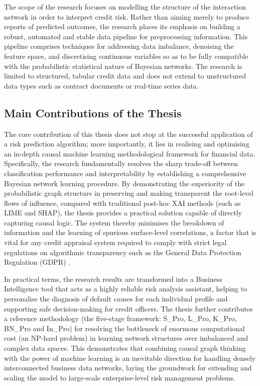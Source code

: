The scope of the research focuses on modelling the structure of the interaction network in order to interpret credit risk. Rather than aiming merely to produce reports of predicted outcomes, the research places its emphasis on building a robust, automated and stable data pipeline for preprocessing information. This pipeline comprises techniques for addressing data imbalance, denoising the feature space, and discretising continuous variables so as to be fully compatible with the probabilistic statistical nature of Bayesian networks. The research is limited to structured, tabular credit data and does not extend to unstructured data types such as contract documents or real-time series data.

\subsection{Main Contributions of the Thesis}
\noindent
The core contribution of this thesis does not stop at the successful application of a risk prediction algorithm; more importantly, it lies in realising and optimising an in-depth causal machine learning methodological framework for financial data. Specifically, the research fundamentally resolves the sharp trade-off between classification performance and interpretability by establishing a comprehensive Bayesian network learning procedure. By demonstrating the superiority of the probabilistic graph structure in preserving and making transparent the root-level flows of influence, compared with traditional post-hoc XAI methods (such as LIME and SHAP), the thesis provides a practical solution capable of directly capturing causal logic. The system thereby minimises the breakdown of information and the learning of spurious surface-level correlations, a factor that is vital for any credit appraisal system required to comply with strict legal regulations on algorithmic transparency such as the General Data Protection Regulation (GDPR) \cite{european2016gdpr}.

In practical terms, the research results are transformed into a Business Intelligence tool that acts as a highly reliable risk analysis assistant, helping to personalise the diagnosis of default causes for each individual profile and supporting safe decision-making for credit officers. The thesis further contributes a reference methodology (the five-stage framework: S\_Pro, L\_Pro, K\_Pro, BN\_Pro and In\_Pro) for resolving the bottleneck of enormous computational cost (an NP-hard problem) in learning network structures over imbalanced and complex data spaces. This demonstrates that combining causal graph thinking with the power of machine learning is an inevitable direction for handling densely interconnected business data networks, laying the groundwork for extending and scaling the model to large-scale enterprise-level risk management problems.

